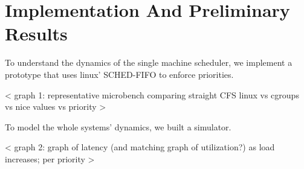 \section{Implementation And Preliminary Results}

To understand the dynamics of the single machine scheduler, we implement a
prototype that uses linux’ SCHED-FIFO to enforce priorities.

< graph 1: representative microbench comparing straight CFS linux vs cgroups vs nice values vs priority >

To model the whole systems’ dynamics, we built a simulator. 

< graph 2: graph of latency (and matching graph of utilization?) as load increases; per priority >
